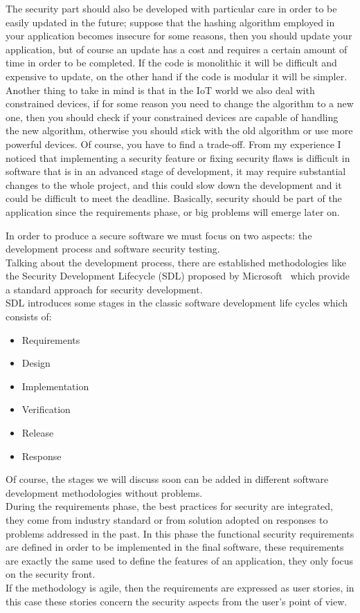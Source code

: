 The security part should also be developed with particular care in order to be easily updated in the future; suppose that the hashing algorithm employed in your application becomes insecure for some reasons, then you should update your application, but of course an update has a cost and requires a certain amount of time in order to be completed. If the code is monolithic it will be difficult and expensive to update, on the other hand if the code is modular it will be simpler.\newline
Another thing to take in mind is that in the IoT world we also deal with constrained devices, if for some reason you need to change the algorithm to a new one, then you should check if your constrained devices are capable of handling the new algorithm, otherwise you should stick with the old algorithm or use more powerful devices. Of course, you have to find a trade-off.\newline
From my experience I noticed that implementing a security feature or fixing security flaws is difficult in software that is in an advanced stage of development, it may require substantial changes to the whole project, and this could slow down the development and it could be difficult to meet the deadline.\newline
Basically, security should be part of the application since the requirements phase, or big problems will emerge later on.\newline

In order to produce a secure software we must focus on two aspects: the development process and software security testing.\\
Talking about the development process, there are established methodologies like the Security Development Lifecycle (SDL) proposed by Microsoft~\cite{microsoftsdl} which provide a standard approach for security development.\\
SDL introduces some stages in the classic software development life cycles which consists of:
\begin{itemize}
	\item Requirements
	\item Design
	\item Implementation
	\item Verification
	\item Release
	\item Response
\end{itemize}
Of course, the stages we will discuss soon can be added in different software development methodologies without problems.\\
During the requirements phase, the best practices for security are integrated, they come from industry standard or from
solution adopted on responses to problems addressed in the past.
In this phase the functional security requirements are defined in order to be implemented in the final software, 
these requirements are exactly the same used to define the features of an application, they only focus on the security front.\\
If the methodology is agile, then the requirements are expressed as user stories, in this case these stories concern the security aspects from the user's point of view.\\

